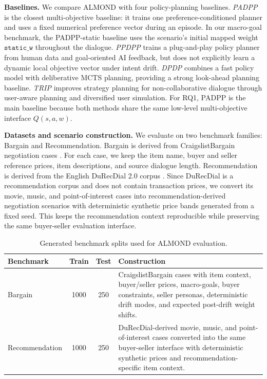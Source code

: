 \documentclass[conference]{IEEEtran}
\begin{document}
\textbf{Baselines.}
We compare ALMOND with four policy-planning baselines. \textit{PADPP}
\cite{dao-liao-2025-one} is the closest multi-objective baseline: it trains one
preference-conditioned planner and uses a fixed numerical preference vector
during an episode. In our macro-goal benchmark, the PADPP-static baseline uses
the scenario's initial mapped weight $\texttt{static\_w}$ throughout the
dialogue. \textit{PPDPP} \cite{deng2024plug} trains a plug-and-play policy
planner from human data and goal-oriented AI feedback, but does not explicitly
learn a dynamic local objective vector under intent drift. \textit{DPDP}
\cite{he2024planning} combines a fast policy model with deliberative MCTS
planning, providing a strong look-ahead planning baseline. \textit{TRIP}
\cite{zhang-etal-2024-strength} improves strategy planning for
non-collaborative dialogue through user-aware planning and diversified user
simulation. For RQ1, PADPP is the main baseline because both methods share the
same low-level multi-objective interface $Q(s,a,w)$.

\textbf{Datasets and scenario construction.}
We evaluate on two benchmark families: Bargain and Recommendation. Bargain is
derived from CraigslistBargain negotiation cases \cite{he-etal-2018-decoupling}.
For each case, we keep the item name, buyer and seller reference prices, item
descriptions, and source dialogue length. Recommendation is derived from the
English DuRecDial 2.0 corpus \cite{liu-etal-2021-durecdial}. Since DuRecDial is
a recommendation corpus and does not contain transaction prices, we convert its
movie, music, and point-of-interest cases into recommendation-derived
negotiation scenarios with deterministic synthetic price bands generated from a
fixed seed. This keeps the recommendation context reproducible while preserving
the same buyer-seller evaluation interface.

\begin{table}[t]
\caption{Generated benchmark splits used for ALMOND evaluation.}
\label{tab:benchmark_splits}
\centering
\begin{tabular}{lccp{9.2cm}}
\hline
\textbf{Benchmark} & \textbf{Train} & \textbf{Test} & \textbf{Construction} \\
\hline
Bargain & 1000 & 250 &
CraigslistBargain cases with item context, buyer/seller prices, macro-goals,
buyer constraints, seller personas, deterministic drift modes, and expected
post-drift weight shifts. \\
Recommendation & 1000 & 250 &
DuRecDial-derived movie, music, and point-of-interest cases converted into the
same buyer-seller interface with deterministic synthetic prices and
recommendation-specific item context. \\
\hline
\end{tabular}
\end{table}
\end{document}
